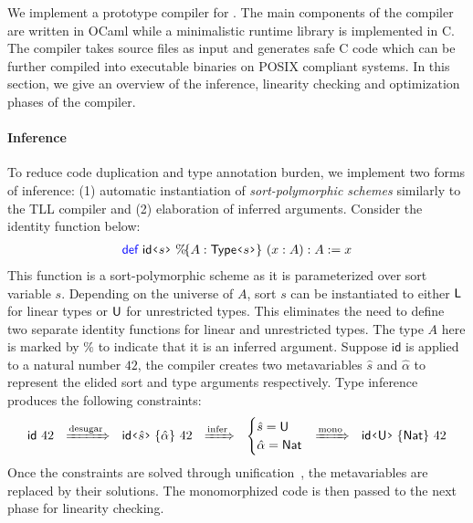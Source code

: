 We implement a prototype compiler for \TLLC{}. The main components of the compiler
are written in OCaml while a minimalistic runtime library is implemented in C.
The compiler takes \TLLC{} source files as input and generates safe C code which
can be further compiled into executable binaries on POSIX compliant systems.
In this section, we give an overview of the inference, linearity checking
and optimization phases of the compiler.

\paragraph{\textbf{Inference}}
To reduce code duplication and type annotation burden, we implement two forms of inference: 
(1) automatic instantiation of \emph{sort-polymorphic schemes} similarly to the TLL compiler and 
(2) elaboration of inferred arguments.
Consider the identity function below:
\begin{align*}
  \Def\ \textsf{id}\flq{s}\frq\ \%\!\{ A : \textsf{Type}\flq{s}\frq\}\ (x : A) : A := x
\end{align*}
This function is a sort-polymorphic scheme as it is parameterized over sort variable $s$.
Depending on the universe of $A$, sort $s$ can be instantiated to either $\textsf{L}$ for linear types
or $\textsf{U}$ for unrestricted types. This eliminates the need to define two separate identity functions
for linear and unrestricted types. The type $A$ here is marked by $\%$ to indicate that it is an
inferred argument. Suppose $\textsf{id}$ is applied to a natural number $42$, the compiler creates
two metavariables $\hat{s}$ and $\hat{\alpha}$ to represent the elided sort and type arguments respectively.
Type inference produces the following constraints:
\begin{align*}
  \textsf{id}\ 42 
  \ \ 
  \xRightarrow{\text{desugar}} 
  \ \ 
  \appI{\textsf{id}\flq{\hat{s}}\frq}{\hat{\alpha}}\ 42
  \ \ 
  \xRightarrow{\text{infer}} 
  \ \ 
  \begin{cases}
    \hat{s} = \Un \\
    \hat{\alpha} = \textsf{Nat}
  \end{cases}
  \!\!
  \xRightarrow{\text{mono}} 
  \ \ 
  \appI{\textsf{id}\flq{\Un}\frq}{\textsf{Nat}}\ 42
\end{align*}
Once the constraints are solved through unification~\cite{abel11}, the metavariables are
replaced by their solutions. The monomorphized code is then passed to the next phase for
linearity checking.


